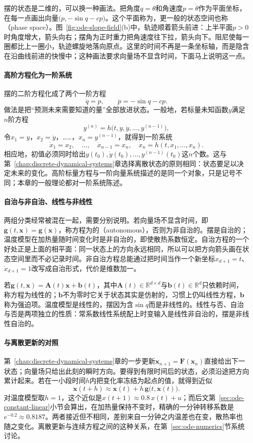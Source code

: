 摆的状态是二维的，可以换一种画法。把角度$q=\theta$和角速度$p=\dot\theta$作为平面坐标，在每一点画出向量$\bigl(p,-\sin q-cp\bigr)$。这个平面称为，更一般的状态空间也称（phase space）。图~\ref{fig:ode-slope-field}(b)中，轨迹顺着箭头前进：上半平面$p>0$时角度增大，箭头向右；摆角为正时重力把角速度往下拉，箭头向下。阻尼使每一圈都比上一圈小，轨迹螺旋地落向原点。这里的时间不再是一条坐标轴，而是隐含在沿曲线前进的快慢中；这种画法要求向量场不显含时间，下面马上说明这一点。

\paragraph{高阶方程化为一阶系统}
摆的二阶方程化成了两个一阶方程
\[
  \dot q=p,\qquad \dot p=-\sin q-cp.
\]
做法是把“预测未来需要知道的量”全部放进状态。一般地，若标量未知函数$y$满足$n$阶方程
\[
  y^{(n)}=h\bigl(t,y,\dot y,\ldots,y^{(n-1)}\bigr),
\]
令$x_1=y$，$x_2=\dot y$，……，$x_n=y^{(n-1)}$，就得到一阶系统
\[
  \dot x_1=x_2,\quad\ldots,\quad\dot x_{n-1}=x_n,\quad\dot x_n=h(t,x_1,\ldots,x_n).
\]
相应地，初值必须同时给出$y(t_0),\dot y(t_0),\ldots,y^{(n-1)}(t_0)$这$n$个数。这与第~\ref{chap:discrete-dynamical-systems}章选择离散状态的原则相同：状态要足以决定未来的变化。高阶标量方程与一阶向量系统描述的是同一个对象，只是记号不同；本章的一般理论都对一阶系统陈述。

\paragraph{自治与非自治、线性与非线性}
两组分类经常被混在一起，需要分别说明。若向量场不显含时间，即$\bm g(t,\bm x)=\bm g(\bm x)$，称方程为的（autonomous），否则为非自治的。摆是自治的；温度模型在加热量随时间变化时是非自治的，即使散热系数恒定。自治方程的一个好处正是上面的相平面：同一状态上的方向永远相同，所以可以把方向箭头画在状态空间里而不必记录时间。非自治方程总能通过把时间当作一个新坐标$x_{d+1}=t$、$\dot x_{d+1}=1$改写成自治形式，代价是维数加一。

若$\bm g(t,\bm x)=\bm A(t)\bm x+\bm b(t)$，其中$\bm A(t)\in\mathbb R^{d\times d}$与$\bm b(t)\in\mathbb R^d$只依赖时间，称方程为线性的；$\bm b$不为零时它关于状态其实是仿射的，习惯上仍叫线性方程，$\bm b$称为强迫项。温度模型是线性的，摆因为含$\sin q$而是非线性的。线性与否、自治与否是两项独立的性质：常系数线性系统配上时变输入是线性非自治的，摆是非线性自治的。

\paragraph{与离散更新的对照}
第~\ref{chap:discrete-dynamical-systems}章的一步更新$\bm x_{n+1}=\bm F(\bm x_n)$直接给出下一状态；向量场只给出此刻的瞬时方向。要得到有限时间后的状态，必须沿途把方向累计起来。若在一小段时间$h$内把变化率冻结为起点的值，就得到近似
\[
  \bm x(t+h)\approx\bm x(t)+h\,\bm g\bigl(t,\bm x(t)\bigr).
\]
对温度模型取$h=1$，这个近似是$x(t+1)\approx0.8\,x(t)+u$；而后文第~\ref{sec:ode-constant-linear}小节会算出，在加热量保持不变时，精确的一分钟转移系数是$e^{-0.2}\approx0.8187$。两者接近但不相同，差别来自一分钟之内温差也在变，散热率也随之变化。离散更新与连续方程之间的这种关系，在第~\ref{sec:ode-numerics}节系统讨论。

